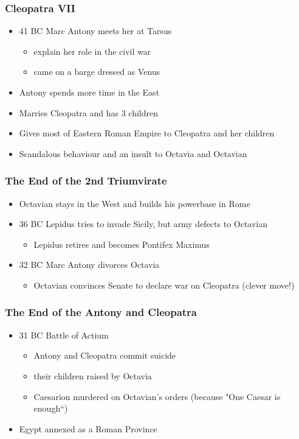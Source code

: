 \documentclass[12pt, twoside]{article}
\begin{document}
\subsubsection{Cleopatra VII}
\begin{itemize}
\item 41 BC Marc Antony meets her at Tarsus
	\begin{itemize}
	\item explain her role in the civil war
	\item came on a barge dressed as Venus
	\end{itemize}
\item Antony spends more time in the East
\item Marries Cleopatra and has 3 children
\item Gives most of Eastern Roman Empire to Cleopatra and her children
\item Scandalous behaviour and an insult to Octavia and Octavian
\end{itemize}

\subsubsection{The End of the 2nd Triumvirate}
\begin{itemize}
\item Octavian stays in the West and builds his powerbase in Rome
\item 36 BC Lepidus tries to invade Sicily, but army defects to Octavian
	\begin{itemize}
	\item Lepidus retires and becomes Pontifex Maximus
	\end{itemize}
\item 32 BC Marc Antony divorces Octavia
	\begin{itemize}
	\item Octavian convinces Senate to declare war on Cleopatra (clever move!)
	\end{itemize}
\end{itemize}

\subsubsection{The End of the Antony and Cleopatra}
\begin{itemize}
\item 31 BC Battle of Actium
	\begin{itemize}
	\item Antony and Cleopatra commit suicide
	\item their children raised by Octavia
	\item Caesarion murdered on Octavian’s orders (because "One Caesar is enough“)
	\end{itemize}
\item Egypt annexed as a Roman Province
\end{itemize}
\end{document}
